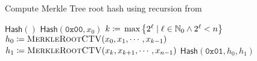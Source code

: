 \begin{algorithm}[t]
\caption{Compute Merkle Tree root hash using \gls{recursion}
    from~\cite{rfc9162}}
\label{alg:merkle_tree_ctv}
\begin{algorithmic}[1]
        \State \Return $\textsf{Hash}()$
        \State \Return $\textsf{Hash}(\texttt{0x00}, x_{0})$
    \Else
        \State $k \coloneqq{}
            \max\left\{ 2^{\ell} \mid \ell\in\mathbb{N}_{0} \land 2^{\ell} < n \right\}$
        \State $h_{0} \coloneqq{}
            \textsc{MerkleRootCTV}(x_{0}, x_{1}, \cdots, x_{k-1})$
        \State $h_{1} \coloneqq{}
            \textsc{MerkleRootCTV}(x_{k}, x_{k+1}, \cdots, x_{n-1})$
        \State \Return $\textsf{Hash}(\texttt{0x01}, h_{0}, h_{1})$
    \EndIf
\EndProcedure
\end{algorithmic}
\end{algorithm}
